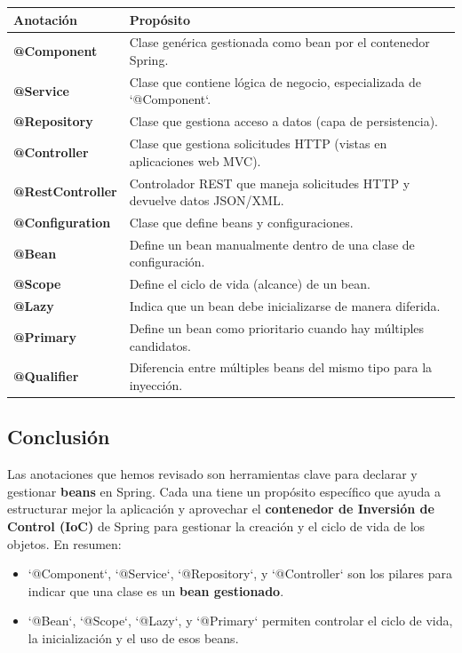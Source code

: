 \documentclass[11pt]{article}
\begin{document}
\begin{center}
\begin{tabular}{ll}
Anotación & Propósito\\[0pt]
\hline
\textbf{\textbf{@Component}} & Clase genérica gestionada como bean por el contenedor Spring.\\[0pt]
\textbf{\textbf{@Service}} & Clase que contiene lógica de negocio, especializada de `@Component`.\\[0pt]
\textbf{\textbf{@Repository}} & Clase que gestiona acceso a datos (capa de persistencia).\\[0pt]
\textbf{\textbf{@Controller}} & Clase que gestiona solicitudes HTTP (vistas en aplicaciones web MVC).\\[0pt]
\textbf{\textbf{@RestController}} & Controlador REST que maneja solicitudes HTTP y devuelve datos JSON/XML.\\[0pt]
\textbf{\textbf{@Configuration}} & Clase que define beans y configuraciones.\\[0pt]
\textbf{\textbf{@Bean}} & Define un bean manualmente dentro de una clase de configuración.\\[0pt]
\textbf{\textbf{@Scope}} & Define el ciclo de vida (alcance) de un bean.\\[0pt]
\textbf{\textbf{@Lazy}} & Indica que un bean debe inicializarse de manera diferida.\\[0pt]
\textbf{\textbf{@Primary}} & Define un bean como prioritario cuando hay múltiples candidatos.\\[0pt]
\textbf{\textbf{@Qualifier}} & Diferencia entre múltiples beans del mismo tipo para la inyección.\\[0pt]
\end{tabular}
\end{center}

\subsection{Conclusión}
\label{sec:org3f79d1b}
Las anotaciones que hemos revisado son herramientas clave para declarar y gestionar \textbf{\textbf{beans}} en Spring. Cada una tiene un propósito específico que ayuda a estructurar mejor la aplicación y aprovechar el \textbf{\textbf{contenedor de Inversión de Control (IoC)}} de Spring para gestionar la creación y el ciclo de vida de los objetos. En resumen:
\begin{itemize}
\item `@Component`, `@Service`, `@Repository`, y `@Controller` son los pilares para indicar que una clase es un \textbf{\textbf{bean gestionado}}.
\item `@Bean`, `@Scope`, `@Lazy`, y `@Primary` permiten controlar el ciclo de vida, la inicialización y el uso de esos beans.
\end{itemize}
\end{document}
